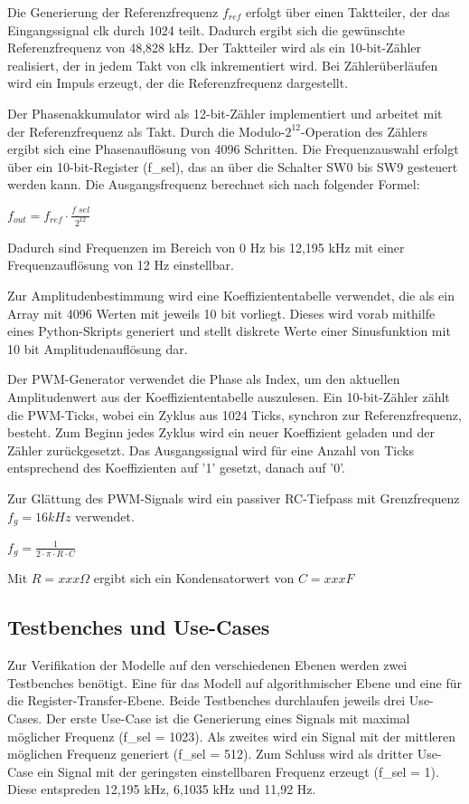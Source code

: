 \noindent Die Generierung der Referenzfrequenz $f_{ref}$ erfolgt über einen Taktteiler, der das Eingangssignal clk durch 1024 teilt.
Dadurch ergibt sich die gewünschte Referenzfrequenz von 48,828 kHz.
Der Taktteiler wird als ein 10-bit-Zähler realisiert, der in jedem Takt von clk inkrementiert wird.
Bei Zählerüberläufen wird ein Impuls erzeugt, der die Referenzfrequenz dargestellt.

\noindent Der Phasenakkumulator wird als 12-bit-Zähler implementiert und arbeitet mit der Referenzfrequenz als Takt.
Durch die Modulo-$2^{12}$-Operation des Zählers ergibt sich eine Phasenauflösung von 4096 Schritten.
Die Frequenzauswahl erfolgt über ein 10-bit-Register (f\_sel), das an über die Schalter SW0 bis SW9 gesteuert werden kann.
Die Ausgangsfrequenz berechnet sich nach folgender Formel:

\begin{math}
    f_{out} = f_{ref} \cdot \frac{f_\_sel}{2^{12}}
\end{math}

\noindent Dadurch sind Frequenzen im Bereich von 0 Hz bis 12,195 kHz mit einer Frequenzauflösung von 12 Hz einstellbar. 

\noindent Zur Amplitudenbestimmung wird eine Koeffiziententabelle verwendet, die als ein Array mit 4096 Werten mit jeweils 10 bit vorliegt.
Dieses wird vorab mithilfe eines Python-Skripts generiert und stellt diskrete Werte einer Sinusfunktion mit 10 bit Amplitudenauflösung dar.

\noindent Der PWM-Generator verwendet die Phase als Index, um den aktuellen Amplitudenwert aus der Koeffiziententabelle auszulesen.
Ein 10-bit-Zähler zählt die PWM-Ticks, wobei ein Zyklus aus 1024 Ticks, synchron zur Referenzfrequenz, besteht.
Zum Beginn jedes Zyklus wird ein neuer Koeffizient geladen und der Zähler zurückgesetzt.
Das Ausgangssignal wird für eine Anzahl von Ticks entsprechend des Koeffizienten auf '1' gesetzt, danach auf '0'.

\noindent Zur Glättung des PWM-Signals wird ein passiver RC-Tiefpass mit Grenzfrequenz $f_g = 16 kHz$ verwendet.

\begin{math}
    f_g=\frac{1}{2 \cdot \pi \cdot R \cdot C}
\end{math}

Mit $R=xxx \Omega$ ergibt sich ein Kondensatorwert von $C=xxx F$

\subsection{Testbenches und Use-Cases}
Zur Verifikation der Modelle auf den verschiedenen Ebenen werden zwei Testbenches 
benötigt.
Eine für das Modell auf algorithmischer Ebene und eine für die Register-Transfer-Ebene.
Beide Testbenches durchlaufen jeweils drei Use-Cases.
Der erste Use-Case ist die Generierung eines Signals mit maximal möglicher Frequenz (f\_sel = 1023).
Als zweites wird ein Signal mit der mittleren möglichen Frequenz generiert (f\_sel = 512).
Zum Schluss wird als dritter Use-Case ein Signal mit der geringsten einstellbaren Frequenz erzeugt (f\_sel = 1).
Diese entspreden 12,195 kHz, 6,1035 kHz und 11,92 Hz.